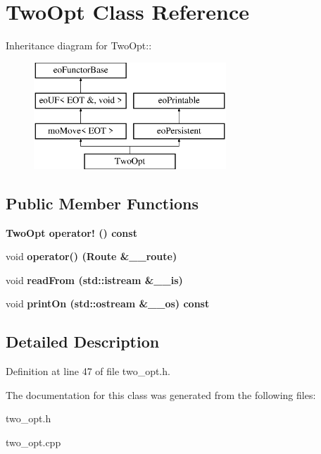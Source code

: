 \section{Two\-Opt Class Reference}
\label{class_two_opt}
Inheritance diagram for Two\-Opt::\begin{figure}[H]
\begin{center}
\leavevmode
\includegraphics[height=4cm]{class_two_opt}
\end{center}
\end{figure}
\subsection*{Public Member Functions}
\begin{CompactItemize}
\item 
\bf{Two\-Opt} \bf{operator!} () const \label{class_two_opt_9fa462668a6f7293d11082d8dae26b6a}

\item 
void \bf{operator()} (\bf{Route} \&\_\-\_\-route)\label{class_two_opt_ff87d1649a33d42a6d64e8d314ed1af0}

\item 
void \bf{read\-From} (std::istream \&\_\-\_\-is)\label{class_two_opt_feccfecca2a6bd2d3a12afdf3f724be0}

\item 
void \bf{print\-On} (std::ostream \&\_\-\_\-os) const \label{class_two_opt_2400db18998b93bfb35783f6681ccd8a}

\end{CompactItemize}


\subsection{Detailed Description}




Definition at line 47 of file two\_\-opt.h.

The documentation for this class was generated from the following files:\begin{CompactItemize}
\item 
two\_\-opt.h\item 
two\_\-opt.cpp\end{CompactItemize}
